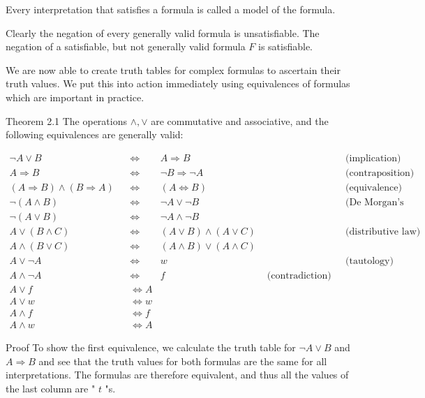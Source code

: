 \documentclass[10pt]{book}
\begin{document}
Every interpretation that satisfies a formula is called a model of the formula.

Clearly the negation of every generally valid formula is unsatisfiable. The negation of a satisfiable, but not generally valid formula $F$ is satisfiable.

We are now able to create truth tables for complex formulas to ascertain their truth values. We put this into action immediately using equivalences of formulas which are important in practice.

Theorem 2.1 The operations $\wedge, \vee$ are commutative and associative, and the following equivalences are generally valid:

$$
\begin{array}{rlrlrl}
\neg A \vee B & & \Leftrightarrow & A \Rightarrow B & & \text { (implication) } \\
A \Rightarrow B & & \Leftrightarrow & \neg B \Rightarrow \neg A & & \text { (contraposition) } \\
(A \Rightarrow B) \wedge(B \Rightarrow A) & & \Leftrightarrow & (A \Leftrightarrow B) & & \text { (equivalence) } \\
\neg(A \wedge B) & & \Leftrightarrow & \neg A \vee \neg B & & \text { (De Morgan's law) } \\
\neg(A \vee B) & & \Leftrightarrow & \neg A \wedge \neg B & & \\
A \vee(B \wedge C) & & \Leftrightarrow & (A \vee B) \wedge(A \vee C) & & \text { (distributive law) } \\
A \wedge(B \vee C) & & \Leftrightarrow & (A \wedge B) \vee(A \wedge C) & & \\
A \vee \neg A & & \Leftrightarrow & w & & \text { (tautology) } \\
A \wedge \neg A & & \Leftrightarrow & f & \text { (contradiction) } \\
A \vee f & & \Leftrightarrow A & & \\
A \vee w & & \Leftrightarrow w & & \\
A \wedge f & & \Leftrightarrow f & & \\
A \wedge w & & \Leftrightarrow A & &
\end{array}
$$

Proof To show the first equivalence, we calculate the truth table for $\neg A \vee B$ and $A \Rightarrow B$ and see that the truth values for both formulas are the same for all interpretations. The formulas are therefore equivalent, and thus all the values of the last column are " $t$ "s.
\end{document}
